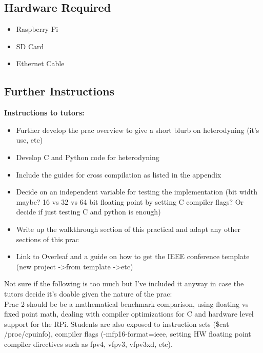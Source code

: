 \subsection{Hardware Required}
\begin{itemize}
    \item Raspberry Pi
    \item SD Card
    \item Ethernet Cable
\end{itemize}

\subsection{Further Instructions}
\textbf{Instructions to tutors:}
\begin{itemize}
    \item Further develop the prac overview to give a short blurb on heterodyning (it's use, etc)
    \item Develop C and Python code for heterodyning
    \item Include the guides for cross compilation as listed in the appendix
    \item Decide on an independent variable for testing the implementation (bit width maybe? 16 vs 32 vs 64 bit floating point by setting C compiler flags? Or decide if just testing C and python is enough)
    \item Write up the walkthrough section of this practical and adapt any other sections of this prac
    \item Link to Overleaf and a guide on how to get the IEEE conference template (new project -\textgreater  from template -\textgreater  etc)
\end{itemize}


Not sure if the following  is too much but I've included it anyway in case the tutors decide it's doable given the nature of the prac:\\
Prac 2 should be be a mathematical benchmark comparison, using floating vs fixed point math, dealing with compiler optimizations for C and hardware level support for the RPi. Students are also exposed to instruction sets (\$cat /proc/cpuinfo), compiler flags (-mfp16-format=ieee, setting HW floating point compiler directives such as fpv4, vfpv3, vfpv3xd, etc).

